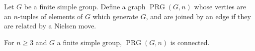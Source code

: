 \documentclass[12pt]{article}
\begin{document}
\begin{definition}\label{def:The_Graph_PRG}
    Let $G$ be a finite simple group. Define a graph $\operatorname{PRG}(G,n)$ whose verties are an $n$-tuples of elements of $G$ which generate $G$, and are joined by an edge if they are related by a Nielsen move.
\end{definition}

\begin{conjecture}\label{conj:Weigold_Conjecture}
    For $n \geq 3$ and $G$ a finite simple group, $\operatorname{PRG}(G,n)$ is connected.
\end{conjecture}
\end{document}
